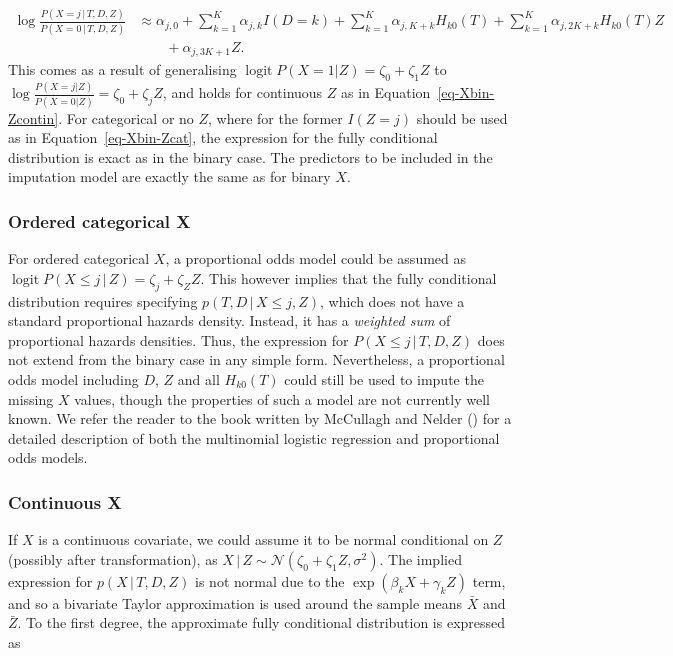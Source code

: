 \documentclass[
  letterpaper,
  DIV=11,
  numbers=noendperiod]{scrreprt}
\DeclareMathOperator{\logit}{logit}
\newcommand{\given}{\,|\,}
\begin{document}
\[
\begin{aligned}
    \log \frac{P(X = j \given T,D,Z)}{P(X = 0\given T,D,Z)} &\approx \alpha_{j,0}  + \sum^K_{k = 1} \alpha_{j,k} I(D=k) + \sum^K_{k = 1} \alpha_{j,K + k} H_{k0}(T) + \sum^K_{k = 1} \alpha_{j,2K + k} H_{k0}(T) Z \nonumber \\
    &\qquad + \alpha_{j,3K + 1} Z.
\end{aligned}
\] This comes as a result of generalising
\(\logit P(X=1|Z) = \zeta_0 + \zeta_1 Z\) to
\(\log \frac{P(X=j|Z)}{P(X=0|Z)} = \zeta_0 + \zeta_j Z\), and holds for
continuous \(Z\) as in Equation~\ref{eq-Xbin-Zcontin}. For categorical
or no \(Z\), where for the former \(I(Z = j)\) should be used as in
Equation~\ref{eq-Xbin-Zcat}, the expression for the fully conditional
distribution is exact as in the binary case. The predictors to be
included in the imputation model are exactly the same as for binary
\(X\).

\subsubsection{Ordered categorical X}\label{ordered-categorical-x}

For ordered categorical \(X\), a proportional odds model could be
assumed as \(\logit P(X \leq j \given Z) = \zeta_{j} + \zeta_Z Z\). This
however implies that the fully conditional distribution requires
specifying \(p(T,D \given X \leq j, Z)\), which does not have a standard
proportional hazards density. Instead, it has a \emph{weighted sum} of
proportional hazards densities. Thus, the expression for
\(P(X \leq j \given T, D, Z)\) does not extend from the binary case in
any simple form. Nevertheless, a proportional odds model including
\(D\), \(Z\) and all \(H_{k0}(T)\) could still be used to impute the
missing \(X\) values, though the properties of such a model are not
currently well known. We refer the reader to the book written by
McCullagh and Nelder () for
a detailed description of both the multinomial logistic regression and
proportional odds models.

\subsubsection{Continuous X}\label{continuous-x}

If \(X\) is a continuous covariate, we could assume it to be normal
conditional on \(Z\) (possibly after transformation), as
\(X \given Z \sim \mathcal{N}(\zeta_0 + \zeta_1 Z, \sigma^2)\). The
implied expression for \(p(X \given T, D, Z)\) is not normal due to the
\(\exp(\beta_k X + \gamma_k Z)\) term, and so a bivariate Taylor
approximation is used around the sample means \(\bar{X}\) and
\(\bar{Z}\). To the first degree, the approximate fully conditional
distribution is expressed as
\end{document}
